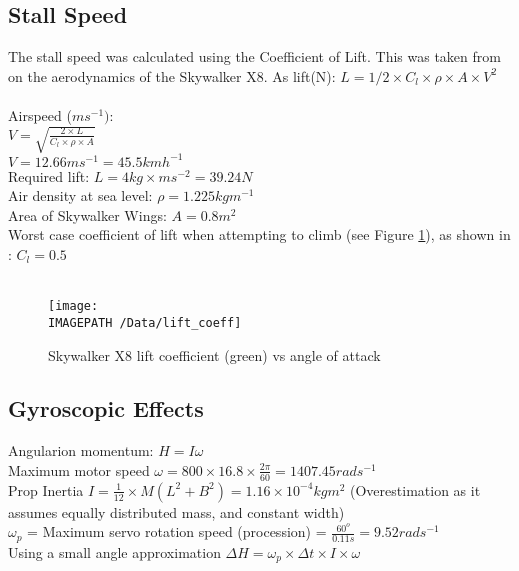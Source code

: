 \subsection{Stall Speed}
\label{sec:stall}
The stall speed was calculated using the Coefficient of Lift. This was taken from \cite{ref:x8aerodynamics} on the aerodynamics of the Skywalker X8.
As lift(N): $L = 1/2\times C_l\times\rho\times A\times V^2$\\\\
Airspeed ($ms^{-1})$:\\
$V= \sqrt{\frac{2\times L}{C_l\times \rho \times A}}$\\
$V = 12.66ms^{-1} = 45.5kmh^{-1}$\\

Required lift: $L = 4kg \times ms^{-2} = 39.24N$\\
Air density at sea level: $\rho = 1.225 kgm^{-1}$\\
Area of Skywalker Wings: $A = 0.8m^2$\\
Worst case coefficient of lift when attempting to climb (see Figure \ref{fig:lift}), as shown in \cite{ref:x8aerodynamics}: $C_l = 0.5$
\\\\
\begin{figure}[!ht]
	\centering
	\texttt{[image: \\IMAGEPATH /Data/lift\_coeff]}
	\caption{Skywalker X8 lift coefficient (green) vs angle of attack}
	\label{fig:lift}
\end{figure}

\subsection{Gyroscopic Effects}
\label{sec:gyro}
Angularion momentum: $H = I\omega$\\

Maximum motor speed $\omega = 800\times16.8\times\frac{2\pi}{60} = 1407.45rads^{-1}$\\

Prop Inertia $I = \frac{1}{12}\times M(L^2+B^2) = 1.16\times10^{-4}kgm^2$ (Overestimation as it assumes equally distributed mass, and constant width)\\

$\omega_p$ = Maximum servo rotation speed (procession) = $\frac{60^o}{0.11s} = 9.52rads^{-1}$\\

Using a small angle approximation $\Delta H = \omega_p \times\Delta t \times I \times \omega$\\ 

